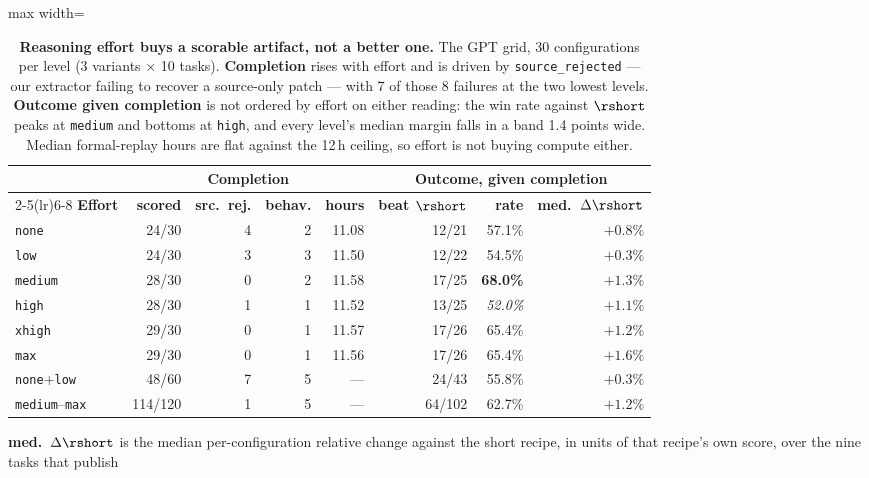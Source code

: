 \begin{table}[t]
\centering
\caption{\textbf{Reasoning effort buys a scorable artifact, not a better one.} The GPT grid, 30
configurations per level (3 variants $\times$ 10 tasks). \textbf{Completion} rises with effort
and is driven by \texttt{source\_rejected} --- our extractor failing to recover a source-only
patch --- with 7 of those 8 failures at the two lowest levels. \textbf{Outcome given completion}
is not ordered by effort on either reading: the win rate against $\rshort$ peaks at
\texttt{medium} and bottoms at \texttt{high}, and every level's median margin falls in a band
1.4 points wide. Median formal-replay hours are flat against the 12\,h ceiling, so effort is not
buying compute either.}
\label{tab:effort}
\small
\begin{adjustbox}{max width=\linewidth}
\begin{tabular}{lrrrrrrr}
\toprule
& \multicolumn{4}{c}{\textbf{Completion}} & \multicolumn{3}{c}{\textbf{Outcome, given completion}} \\
\cmidrule(lr){2-5}\cmidrule(lr){6-8}
\textbf{Effort} & \textbf{scored} & \textbf{src.\ rej.} & \textbf{behav.} & \textbf{hours} & \textbf{beat $\rshort$} & \textbf{rate} & \textbf{med.\ $\Delta\rshort$} \\
\midrule
\texttt{none}   & 24/30 & 4 & 2 & 11.08 & 12/21 & 57.1\% & $+0.8\%$ \\
\texttt{low}    & 24/30 & 3 & 3 & 11.50 & 12/22 & 54.5\% & $+0.3\%$ \\
\texttt{medium} & 28/30 & 0 & 2 & 11.58 & 17/25 & \textbf{68.0\%} & $+1.3\%$ \\
\texttt{high}   & 28/30 & 1 & 1 & 11.52 & 13/25 & \emph{52.0\%} & $+1.1\%$ \\
\texttt{xhigh}  & 29/30 & 0 & 1 & 11.57 & 17/26 & 65.4\% & $+1.2\%$ \\
\texttt{max}    & 29/30 & 0 & 1 & 11.56 & 17/26 & 65.4\% & $+1.6\%$ \\
\midrule
\texttt{none}+\texttt{low}       & 48/60 & 7 & 5 & --- & 24/43 & 55.8\% & $+0.3\%$ \\
\texttt{medium}--\texttt{max}    & 114/120 & 1 & 5 & --- & 64/102 & 62.7\% & $+1.2\%$ \\
\bottomrule
\end{tabular}
\end{adjustbox}
\par\vspace{2pt}
{\footnotesize \textbf{med.\ $\Delta\rshort$} is the median per-configuration relative change
against the short recipe, in units of that recipe's own score, over the nine tasks that publish
}
\end{table}
